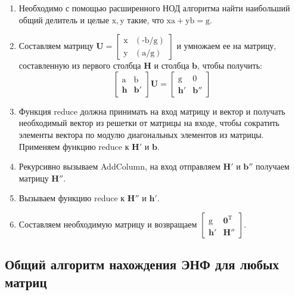 \begin{enumerate}
\item Необходимо с помощью расширенного НОД алгоритма найти наибольший общий делитель и целые $ \mathrm{x, y} $ такие, что $ \mathrm{xa + yb = g} $.
\item Составляем матрицу $ \mathbf{U}= \left[\begin{array}{cccc}
\mathrm{x} & \mathrm{(\text{-}b/g)} \\
\mathrm{y} & \mathrm{(a/g)} \end{array}\right] $ и умножаем ее на матрицу, составленную из первого столбца $ \mathbf{H} $ и столбца $ \mathbf{b} $, чтобы получить:
$$ \left[\begin{array}{cccc}
\mathrm{a} & \mathrm{b} \\
\mathbf{h} & \mathbf{b}' \end{array}\right] \mathbf{U}=
\left[\begin{array}{cccc}
\mathrm{g} & \mathrm{0} \\
\mathbf{h}' & \mathbf{b}'' \end{array}\right] $$
\item Функция reduce должна принимать на вход матрицу и вектор и получать необходимый вектор из решетки от матрицы на входе, чтобы сократить элементы вектора по модулю диагональных элементов из матрицы. Применяем функцию reduce к $ \mathbf{H}' $ и $ \mathbf{b} $.
\item Рекурсивно вызываем AddColumn, на вход отправляем $ \mathbf{H}' $ и $ \mathbf{b}'' $  получаем матрицу $ \mathbf{H}'' $.
\item Вызываем функцию reduce к $ \mathbf{H}'' $ и $ \mathbf{h}' $.
\item Составляем необходимую матрицу и возвращаем $ \left[\begin{array}{cccc}
\mathrm{g} & \mathbf{0}^\mathrm{T} \\
\mathbf{h}' & \mathbf{H}'' \end{array}\right] $.
\end{enumerate}

\subsection{Общий алгоритм нахождения ЭНФ для любых матриц}

